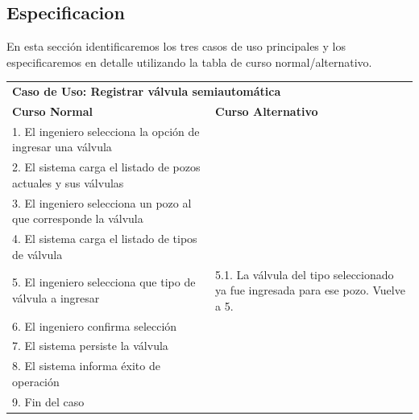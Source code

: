 \documentclass{article}
\theoremstyle{definition}
\theoremstyle{remark}
\begin{document}
\subsection{Especificacion}

\newcommand{\curef}[1]{\textbf{Caso de uso \ref{cu:#1}}}
\newcommand{\cutitle}[1]{\renewcommand{\givencutitle}{#1}}
\newcommand{\cuactors}[1]{\renewcommand{\givencuactors}{#1}}
\newcommand{\cupre}[1]{\renewcommand{\givencupre}{#1}}
\newcommand{\cupost}[1]{\renewcommand{\givencupost}{#1}}
\newcommand{\cucourse}[1]{\renewcommand{\givencucourse}{#1}}
\newcommand{\culabel}[1]{\renewcommand{\givenculabel}{#1}}
\newcommand{\cucaption}[1]{\renewcommand{\givencucaption}{#1}}
\newcommand{\givencutitle}{REQUIRED!}
\newcommand{\givencuactors}{REQUIRED!}
\newcommand{\givencupre}{-}
\newcommand{\givencupost}{-}
\newcommand{\givencucourse}{REQUIRED!}
\newcommand{\givenculabel}{REQUIRED!}
\newcommand{\givencucaption}{} %

\newenvironment{casodeuso}
{\begin{table}[H]}{%
\begin{tabular}{|p{0.5\linewidth} p{0.5\linewidth}|}\hline
\multicolumn{2}{|l|}{\textbf{Caso de Uso: \givencutitle}} \\
\vspace{1px}\textbf{Curso Normal} & \vspace{1px}\textbf{Curso Alternativo} \\
\givencucourse
\hline
\end{tabular}
\label{cu:\givenculabel}
\end{table}}

En esta sección identificaremos los tres casos de uso principales y los especificaremos en detalle utilizando la tabla de curso normal/alternativo.

\begin{casodeuso}
  \cutitle{Registrar válvula semiautomática}
  \cucourse{
    1. El ingeniero selecciona la opción de ingresar una válvula & \\
    2. El sistema carga el listado de pozos actuales y sus válvulas \\
    3. El ingeniero selecciona un pozo al que corresponde la válvula & \\
    4. El sistema carga el listado de tipos de válvula & \\
    5. El ingeniero selecciona que tipo de válvula a ingresar & 5.1. La válvula del tipo seleccionado ya fue ingresada para ese pozo. Vuelve a 5. \\
    6. El ingeniero confirma selección & \\
    7. El sistema persiste la válvula & \\
    8. El sistema informa éxito de operación & \\
    9. Fin del caso & \\
  }
  \culabel{regval}
\end{casodeuso}
\end{document}
